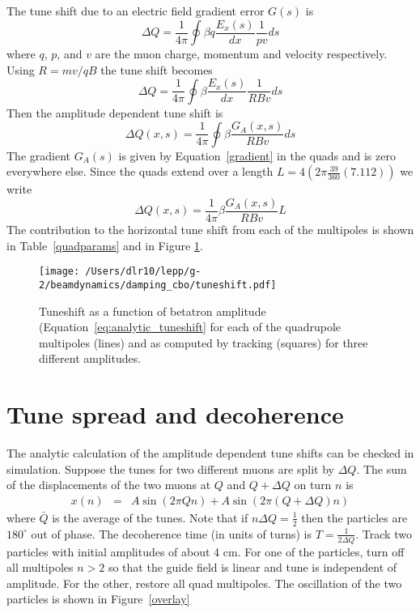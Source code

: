 \documentclass[10pt]{report}
\begin{document}
The tune shift due to an electric field gradient error $G(s)$ is $$\Delta Q = \frac{1}{4\pi}\oint\beta q\frac{E_x(s)}{dx}\frac{1}{pv}ds$$
where $q$, $p$, and $v$ are the muon charge, momentum and velocity respectively. Using $R=mv/qB$ 
the tune shift becomes $$\Delta Q = \frac{1}{4\pi}\oint\beta \frac{E_x(s)}{dx}\frac{1}{RBv}ds$$
Then the amplitude dependent tune shift is 
$$\Delta Q(x,s) = \frac{1}{4\pi}\oint \beta \frac{ G_A(x,s)}{RBv} ds$$
The gradient $G_A(s)$ is given by Equation~\ref{gradient} in the quads and is zero everywhere else.
Since the quads extend over a length
$L = 4(2\pi\frac{39}{360}(7.112))$ we write
\begin{equation}
\Delta Q(x,s) = \frac{1}{4\pi} \beta \frac{ G_A(x,s)}{RBv} L\label{eq:analytic_tuneshift}
\end{equation}
The contribution to the horizontal tune shift from each of the multipoles is shown in Table~\ref{quadparams} and in Figure \ref{mp_tuneshift}.
\begin{figure}[htbp] %
   \centering
   \texttt{[image: /Users/dlr10/lepp/g-2/beamdynamics/damping\_cbo/tuneshift.pdf]} 
   \caption{Tuneshift as a function of betatron amplitude (Equation~\ref{eq:analytic_tuneshift} for each of the quadrupole multipoles (lines) and as computed by tracking (squares) for
three different amplitudes.
 \label{mp_tuneshift}}
\end{figure}
\section*{Tune spread and decoherence}
The analytic calculation of the amplitude dependent tune shifts can be checked in simulation. 
Suppose the tunes for two different muons are split by $\Delta Q$.
The sum of the displacements of the two muons at $Q$ and $Q +\Delta Q$ on turn $n$ is
\begin{eqnarray*}
x(n)&=&A\sin (2\pi Q n) + A\sin(2\pi (Q+\Delta Q)n)
\end{eqnarray*}
where $\bar Q$ is the average of the tunes. Note that if $n\Delta Q = \frac{1}{2}$ then the particles are $180^\circ$ out of phase. The decoherence time (in units of turns) is
$T = \frac{1}{2\Delta Q}$.
Track two particles with initial amplitudes of about 4 cm. For one of the particles, turn off all multipoles $n>2$ so that the guide field is linear and tune is independent
of amplitude. For the other, restore all quad multipoles. The oscillation of the two particles is shown in Figure~\ref{overlay}
\end{document}
